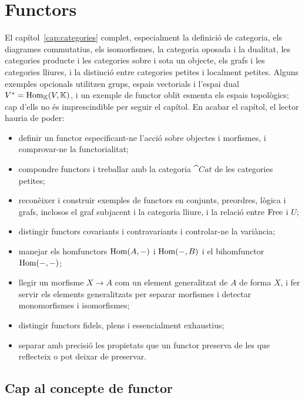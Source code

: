\chapter{Functors}
\label{cap:functors}

\begin{objectius}
 El capítol~\ref{cap:categories} complet, especialment la definició de categoria, els diagrames commutatius, els isomorfismes, la categoria oposada i la dualitat, les categories producte i les categories sobre i sota un objecte, els grafs i les categories lliures, i la distinció entre categories petites i localment petites. Alguns exemples opcionals utilitzen grups, espais vectorials i l'espai dual $V^*=\operatorname{Hom}_{\mathbb K}(V,\mathbb K)$, i un exemple de functor oblit esmenta els espais topològics; cap d'ells no és imprescindible per seguir el capítol.
 En acabar el capítol, el lector hauria de poder:
\begin{itemize}
  \item definir un functor especificant-ne l'acció sobre objectes i morfismes, i comprovar-ne la functorialitat;
  \item compondre functors i treballar amb la categoria $\cat{Cat}$ de les categories petites;
  \item reconèixer i construir exemples de functors en conjunts, preordres, lògica i grafs, inclosos el graf subjacent i la categoria lliure, i la relació entre $\operatorname{Free}$ i $U$;
  \item distingir functors covariants i contravariants i controlar-ne la variància;
  \item manejar els homfunctors $\operatorname{Hom}(A,-)$ i $\operatorname{Hom}(-,B)$ i el bihomfunctor $\operatorname{Hom}(-,-)$;
  \item llegir un morfisme $X\to A$ com un element generalitzat de $A$ de forma $X$, i fer servir els elements generalitzats per separar morfismes i detectar monomorfismes i isomorfismes;
  \item distingir functors fidels, plens i essencialment exhaustius;
  \item separar amb precisió les propietats que un functor preserva de les que reflecteix o pot deixar de preservar.
\end{itemize}
\end{objectius}

\section{Cap al concepte de functor}

